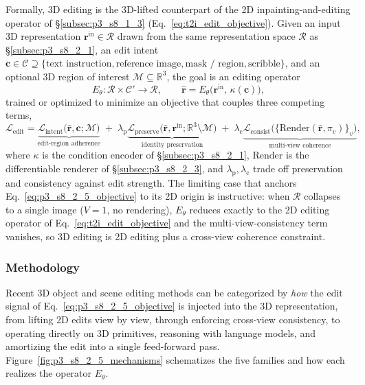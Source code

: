 Formally, 3D editing is the 3D-lifted counterpart of the 2D inpainting-and-editing operator of §\ref{subsec:p3_s8_1_3} (Eq.~\eqref{eq:t2i_edit_objective}).
Given an input 3D representation $\mathbf{r}^{\text{in}}\in\mathcal{R}$ drawn from the same representation space $\mathcal{R}$ as §\ref{subsec:p3_s8_2_1}, an edit intent $\mathbf{c}\in\mathcal{C}\supseteq\{\text{text instruction},\text{reference image},\text{mask / region},\text{scribble}\}$, and an optional 3D region of interest $\mathcal{M}\subseteq\mathbb{R}^3$, the goal is an editing operator
\begin{equation}
E_\theta:\mathcal{R}\times\mathcal{C}'\rightarrow\mathcal{R},
\qquad
\hat{\mathbf{r}} = E_\theta\big(\mathbf{r}^{\text{in}},\,\kappa(\mathbf{c})\big),
\label{eq:p3_s8_2_5_objective}
\end{equation}
trained or optimized to minimize an objective that couples three competing terms,
\begin{equation}
\mathcal{L}_{\text{edit}}
=
\underbrace{\mathcal{L}_{\text{intent}}\big(\hat{\mathbf{r}},\mathbf{c};\mathcal{M}\big)}_{\text{edit-region adherence}}
\;+\;
\lambda_{\text{p}}\underbrace{\mathcal{L}_{\text{preserve}}\big(\hat{\mathbf{r}},\mathbf{r}^{\text{in}};\mathbb{R}^3\!\setminus\!\mathcal{M}\big)}_{\text{identity preservation}}
\;+\;
\lambda_{\text{c}}\underbrace{\mathcal{L}_{\text{consist}}\big(\{\mathrm{Render}(\hat{\mathbf{r}},\pi_v)\}_v\big)}_{\text{multi-view coherence}},
\label{eq:p3_s8_2_5_loss}
\end{equation}
where $\kappa$ is the condition encoder of §\ref{subsec:p3_s8_2_1}, $\mathrm{Render}$ is the differentiable renderer of §\ref{subsec:p3_s8_2_3}, and $\lambda_{\text{p}},\lambda_{\text{c}}$ trade off preservation and consistency against edit strength.
The limiting case that anchors Eq.~\eqref{eq:p3_s8_2_5_objective} to its 2D origin is instructive: when $\mathcal{R}$ collapses to a single image ($V=1$, no rendering), $E_\theta$ reduces exactly to the 2D editing operator of Eq.~\eqref{eq:t2i_edit_objective} and the multi-view-consistency term vanishes, so 3D editing is 2D editing plus a cross-view coherence constraint.


\subsubsection{Methodology}
\label{subsubsec:p3_s8_2_5_methodology}

Recent 3D object and scene editing methods can be categorized by \emph{how} the edit signal of Eq.~\eqref{eq:p3_s8_2_5_objective} is injected into the 3D representation, from lifting 2D edits view by view, through enforcing cross-view consistency, to operating directly on 3D primitives, reasoning with language models, and amortizing the edit into a single feed-forward pass.
Figure~\ref{fig:p3_s8_2_5_mechanisms} schematizes the five families and how each realizes the operator $E_\theta$.

